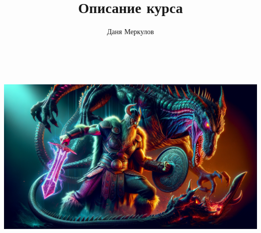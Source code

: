 \documentclass[9pt, aspectratio=169]{beamer}
\title{Описание курса}
\author{Даня Меркулов}
\date{}
\begin{document}
 \begin{frame}
  \begin{minipage}{0.618\textwidth}
    \\
    \vspace{5pt}
    \\
    \vspace{10pt}
    \includegraphics[width=\textwidth]{back.png}
  \end{minipage}%
  \begin{minipage}{0.382\textwidth}
    \maketitle
  \end{minipage}
 \end{frame}

\end{document}
